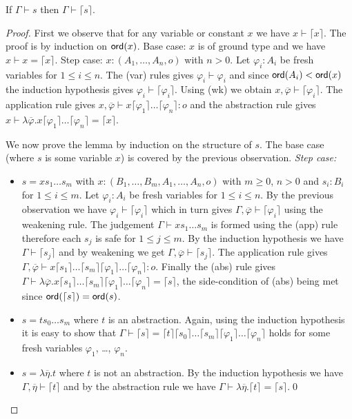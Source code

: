 \documentclass{llncs}
\newcommand{\elnf}[1]{\lceil #1\rceil} %
\begin{document}
\begin{lemma}
\label{lem:elnf_preserves_safety}
If $\Gamma \vdash s$ then $\Gamma \vdash \elnf{s}$.
\end{lemma}
\begin{proof}

  First we observe that for any variable or constant $x$ we have $x
  \vdash \elnf{x}$. The proof is by induction on ${\sf ord}(x)$. Base case:
  $x$ is of ground type and we have $x \vdash x = \elnf{x}$. Step
  case: $x:(A_1, \ldots, A_n,o)$ with $n>0$. Let $\varphi_i:A_i$ be
  fresh variables for $1\leq i\leq n$. The (var) rules gives
  $\varphi_i \vdash \varphi_i$ and since ${\sf ord}(A_i) < {\sf ord}(x)$ the
  induction hypothesis gives $\varphi_i \vdash
  \elnf{\varphi_i}$. Using (wk) we obtain $x, \overline{\varphi}
  \vdash \elnf{\varphi_i}$.  The application rule gives $x,
  \overline{\varphi} \vdash x \elnf{\varphi_1} \ldots \elnf{\varphi_n}
  : o$ and the abstraction rule gives $ x \vdash \lambda
  \overline{\varphi} . x \elnf{\varphi_1} \ldots \elnf{\varphi_n} =
  \elnf{x}$.


We now prove the lemma by induction on the structure of $s$.
The base case (where $s$ is some variable $x$) is covered by the previous observation.
\emph{Step case:} 
\begin{itemize}
\item $s = x s_1 \ldots s_m$ with $x: (B_1, \ldots, B_m, A_1, \ldots, A_n, o)$ with $m\geq 0$, $n>0$ and $s_i : B_i$ for $1 \leq i \leq m$. 
Let $\varphi_i: A_i$ be fresh variables for $1\leq i \leq n$. By the previous observation we have $\varphi_i \vdash \elnf{\varphi_i}$ which in turn gives $\Gamma , \overline{\varphi} \vdash \elnf{\varphi_i}$ using the weakening rule.
The judgement $\Gamma \vdash x s_1 \ldots s_m$ is formed using the (app) rule therefore each $s_j$ is safe for $1\leq j \leq m$. By the induction hypothesis we have $\Gamma \vdash \elnf{s_j}$ and by weakening we get $\Gamma, \overline{\varphi} \vdash \elnf{s_j}$.
The application rule gives $\Gamma, \overline{\varphi} \vdash 
x \elnf{s_1} \ldots \elnf{s_m} \elnf{\varphi_1} \ldots \elnf{\varphi_n} : o$. Finally the (abs) rule gives $\Gamma \vdash \lambda \overline{\varphi} . x \elnf{s_1} \ldots \elnf{s_m}  \elnf{\varphi_1} \ldots \elnf{\varphi_n} = \elnf{s}$, the side-condition of (abs) being met since $\ord{\elnf{s}} = \ord{s}$.


\item $s = t s_0 \ldots s_m$ where $t$ is an abstraction. Again, using the induction hypothesis it is easy to show that $\Gamma \vdash \elnf{s} = \elnf{t} \elnf{s_0} \ldots \elnf{s_m} \elnf{\varphi_1} \ldots \elnf{\varphi_n}$ holds for some fresh variables $\varphi_1$, \ldots, $\varphi_n$.

\item $s = \lambda \overline{\eta} . t$ where $t$ is not an abstraction. By the induction hypothesis we have $\Gamma, \overline{\eta} \vdash \elnf{t}$ and by the abstraction rule we have $\Gamma \vdash \lambda \overline{\eta} . \elnf{t} = \elnf{s}$.\qed
\end{itemize} 
\end{proof}
\end{document}
